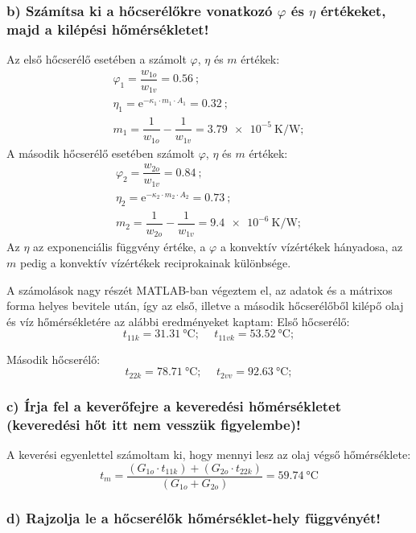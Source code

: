 \subsubsection{b) Számítsa ki a hőcserélőkre vonatkozó $\varphi$ és $\eta$ értékeket, majd a kilépési hőmérsékletet!} 
\noindent Az első hőcserélő esetében a számolt $\varphi$, $\eta$ és $m$ értékek:
\begin{gather*}
		\varphi_1 = \dfrac{w_{1o}}{w_{1v}} = \SI{0.56}{}; \\ 
		\eta_1 = \mathrm{e}^{-\kappa_1\cdot m_1\cdot A_1} = \SI{0.32}{}; \\
		m_1 = \dfrac{1}{w_{1o}}-\dfrac{1}{w_{1v}} = \SI{3.79e-5}{\kelvin\per\watt};
\end{gather*}
\noindent A második hőcserélő esetében számolt $\varphi$, $\eta$ és $m$ értékek:
\begin{gather*}
		\varphi_2 = \dfrac{w_{2o}}{w_{1v}} = \SI{0.84}{}; \\ 
		\eta_2 = \mathrm{e}^{-\kappa_2\cdot m_2\cdot A_2} = \SI{0.73}{}; \\
		m_2 = \dfrac{1}{w_{2o}}-\dfrac{1}{w_{1v}} = \SI{9.4e-6}{\kelvin\per\watt};
\end{gather*}
\noindent Az $\eta$ az exponenciális függvény értéke, a $\varphi$ a konvektív vízértékek hányadosa, az $m$ pedig a konvektív vízértékek reciprokainak különbsége.

\vspace{10pt}
A számolások nagy részét MATLAB-ban végeztem el, az adatok és a mátrixos forma helyes bevitele után, így az első, illetve a második hőcserélőből kilépő olaj és víz hőmérsékletére az alábbi eredményeket kaptam:
\vspace{10pt} \newline
Első hőcserélő: 
\begin{equation*}
	t_{11k} = \SI{31.31}{\celsius}; \hspace{15pt}
	t_{11vk} = \SI{53.52}{\celsius};
\end{equation*}

Második hőcserélő:
\begin{equation*}
	t_{22k} = \SI{78.71}{\celsius}; \hspace{15pt}
	t_{2vv} = \SI{92.63}{\celsius};
\end{equation*}

\subsubsection{c) Írja fel a keverőfejre a keveredési hőmérsékletet (keveredési hőt itt nem vesszük figyelembe)!}
\noindent A keverési egyenlettel számoltam ki, hogy mennyi lesz az olaj végső hőmérséklete:
\begin{equation*}
		t_m = \dfrac{(G_{1o}\cdot t_{11k})+(G_{2o}\cdot t_{22k})}{(G_{1o}+G_{2o})} = \SI{59.74}{\celsius}
\end{equation*}

\subsubsection{d) Rajzolja le a hőcserélők hőmérséklet-hely függvényét!}
